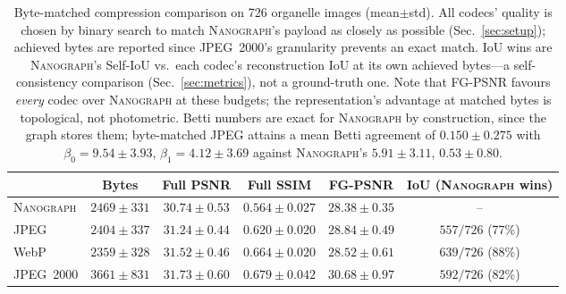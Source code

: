 \documentclass[10pt,a4paper]{article}
\newcommand{\method}{\textnormal{\textsc{Nanograph}}\xspace}
\begin{document}
\begin{table}[t]
\centering
\caption{Byte-matched compression comparison on 726 organelle images
(mean$\pm$std). All codecs' quality is chosen by binary search to match
\method's payload as closely as possible (Sec.~\ref{sec:setup}); achieved
bytes are reported since JPEG~2000's granularity prevents an exact match.
IoU wins are \method's Self-IoU vs.\ each codec's reconstruction IoU at its
own achieved bytes---a self-consistency comparison (Sec.~\ref{sec:metrics}),
not a ground-truth one. Note that FG-PSNR favours \emph{every} codec over
\method at these budgets; the representation's advantage at matched bytes is
topological, not photometric. Betti numbers are exact for \method by
construction, since the graph stores them; byte-matched JPEG attains a mean
Betti agreement of $0.150\pm0.275$ with $\beta_0=9.54\pm3.93$,
$\beta_1=4.12\pm3.69$ against \method's $5.91\pm3.11$, $0.53\pm0.80$.}
\label{tab:codec}
\footnotesize
\setlength{\tabcolsep}{4pt}
\begin{tabular}{lccccc}
\toprule
 & Bytes & Full PSNR & Full SSIM & FG-PSNR & IoU (\method wins)\\
\midrule
\method    & $2469\pm331$ & $30.74\pm0.53$ & $0.564\pm0.027$ & $28.38\pm0.35$ & --\\
JPEG       & $2404\pm337$ & $31.24\pm0.44$ & $0.620\pm0.020$ & $28.84\pm0.49$ & $557/726$ (77\%)\\
WebP       & $2359\pm328$ & $31.52\pm0.46$ & $0.664\pm0.020$ & $28.52\pm0.61$ & $639/726$ (88\%)\\
JPEG~2000  & $3661\pm831$ & $31.73\pm0.60$ & $0.679\pm0.042$ & $30.68\pm0.97$ & $592/726$ (82\%)\\
\bottomrule
\end{tabular}
\end{table}
\end{document}
